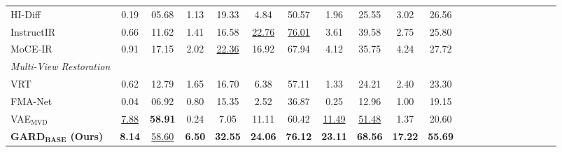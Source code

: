 \documentclass{llmxive}
\begin{document}
\begin{table}[h]
{\begin{tabular}{lcccccccccccccccccccc}

HI-Diff~\cite{chen2023hierarchical}
&   0.19    &       05.68
&   1.13    &       19.33
&   4.84    &       50.57
&   1.96    &       25.55
&   3.02    &       26.56
\\



InstructIR~\cite{conde2024high}
&   0.66    &       11.62
&   1.41    &       16.58
&   \underline{22.76}    &       \underline{76.01}
&   3.61    &        39.58
&   2.75    &       25.80
\\

MoCE-IR~\cite{zamfir2024complexityexperts}
&   0.91    &     17.15
&   2.02   &      \underline{22.36}
&   16.92    &     67.94  
&   4.12    &      35.75 
&   4.24    &     27.72   
\\


\midrule

\textit{Multi-View Restoration} \\
\midrule

VRT~\cite{liang2024vrt}
&    0.62   &    12.79   
&    1.65   &    16.70   
&    6.38   &    57.11   
&    1.33   &    24.21   
&    2.40   &    23.30
\\


FMA-Net~\cite{Youk_2024_CVPR}
&   0.04    &       06.92
&   0.80    &       15.35
&   2.52    &       36.87
&   0.25   &        12.96
&   1.00    &       19.15
\\


VAE$_\text{MVD}$
&    \underline{7.88}   &     \textbf{58.91  }
&    0.24   &     7.05 
&    11.11   &    60.42  
&    \underline{11.49}   &    \underline{51.48}
&    1.37   &     20.60
\\






\textbf{GARD$_\textbf{BASE}$ (Ours)}
&    \textbf{8.14}   &       \underline{58.60}
&    \textbf{6.50}   &       \textbf{32.55}
&    \textbf{24.06}   &      \textbf{76.12}
&    \textbf{23.11}   &      \textbf{68.56}
&    \textbf{17.22}   &      \textbf{55.69}
\\





\end{tabular}}
\end{table}
\end{document}
